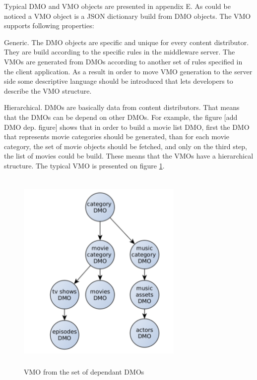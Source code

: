 
Typical DMO and VMO objects are presented in appendix E. As could be noticed a VMO object is a JSON dictionary build from DMO objects. The VMO supports following properties:

Generic. The DMO objects are specific and unique for every content distributor. They are build according to the specific rules in the middleware server. The VMOs are generated from DMOs according to another set of rules specified in the client application. As a result in order to move VMO generation to the server side some descriptive language should be introduced that lets developers to describe the VMO structure.

Hierarchical. DMOs are basically data from content distributors. That means that the DMOs can be depend on other DMOs. For example, the figure [add DMO dep. figure] shows that in order to build a movie list DMO, first the DMO that represents movie categories should be generated, than for each movie category, the set of movie objects should be fetched, and only on the third step, the list of movies could be build. These means that the VMOs have a hierarchical structure. The typical VMO is presented on figure \ref{fig:vmo_example}.

\begin{figure}[h]
    \centering
	\includegraphics[width=8cm,height=10cm,keepaspectratio]{images/vmo_example.png}
    \caption{VMO from the set of dependant DMOs}
    \label{fig:vmo_example}
\end{figure} 

